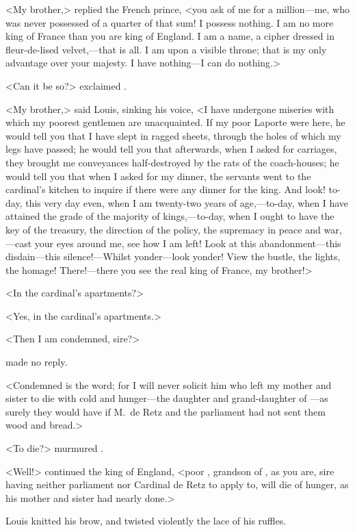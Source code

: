 <My brother,> replied the French prince, <you ask of me for a million—me, who was never possessed of a quarter of that sum! I possess nothing. I am no more king of France than you are king of England. I am a name, a cipher dressed in fleur-de-lised velvet,—that is all. I am upon a visible throne; that is my only advantage over your majesty. I have nothing—I can do nothing.>

<Can it be so?> exclaimed .

<My brother,> said Louis, sinking his voice, <I have undergone miseries with which my poorest gentlemen are unacquainted. If my poor Laporte were here, he would tell you that I have slept in ragged sheets, through the holes of which my legs have passed; he would tell you that afterwards, when I asked for carriages, they brought me conveyances half-destroyed by the rats of the coach-houses; he would tell you that when I asked for my dinner, the servants went to the cardinal's kitchen to inquire if there were any dinner for the king. And look! to-day, this very day even, when I am twenty-two years of age,—to-day, when I have attained the grade of the majority of kings,—to-day, when I ought to have the key of the treasury, the direction of the policy, the supremacy in peace and war,—cast your eyes around me, see how I am left! Look at this abandonment—this disdain—this silence!—Whilst yonder—look yonder! View the bustle, the lights, the homage! There!—there you see the real king of France, my brother!>

<In the cardinal's apartments?>

<Yes, in the cardinal's apartments.>

<Then I am condemned, sire?>

 made no reply.

<Condemned is the word; for I will never solicit him who left my mother and sister to die with cold and hunger—the daughter and grand-daughter of —as surely they would have if M.~de Retz and the parliament had not sent them wood and bread.>

<To die?> murmured .

<Well!> continued the king of England, <poor , grandson of , as you are, sire having neither parliament nor Cardinal de Retz to apply to, will die of hunger, as his mother and sister had nearly done.>

Louis knitted his brow, and twisted violently the lace of his ruffles.

